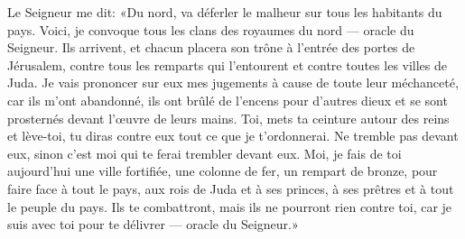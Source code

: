 Le Seigneur me dit:
	«Du nord, va déferler le malheur sur tous les habitants du pays.
Voici, je convoque tous les clans des royaumes du nord --- oracle du Seigneur.
Ils arrivent, et chacun placera son trône à l’entrée des portes de Jérusalem,
	contre tous les remparts qui l’entourent
	et contre toutes les villes de Juda.
Je vais prononcer sur eux mes jugements à cause de toute leur méchanceté,
	car ils m’ont abandonné, ils ont brûlé de l’encens pour d’autres dieux
	et se sont prosternés devant l’œuvre de leurs mains.
Toi, mets ta ceinture autour des reins et lève-toi,
	tu diras contre eux tout ce que je t’ordonnerai.
Ne tremble pas devant eux, sinon c’est moi qui te ferai trembler devant eux.
Moi, je fais de toi aujourd’hui une ville fortifiée,
	une colonne de fer, un rempart de bronze,
	pour faire face à tout le pays, aux rois de Juda et à ses princes,
	à ses prêtres et à tout le peuple du pays.
Ils te combattront, mais ils ne pourront rien contre toi,
	car je suis avec toi pour te délivrer --- oracle du Seigneur.»
